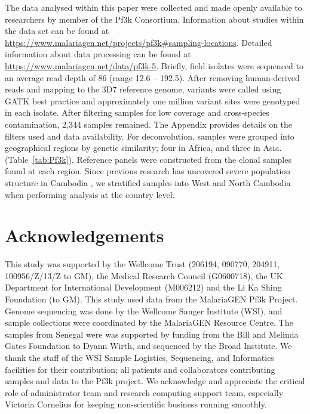 \documentclass[9pt,lineno]{elife}
\begin{document}
The data analysed within this paper were collected and made openly available to researchers by member of the Pf3k Consortium.  Information about studies within the data set can be found at \url{https://www.malariagen.net/projects/pf3k#sampling-locations}.  Detailed information about data processing can be found at \url{https://www.malariagen.net/data/pf3k-5}.  Briefly, field isolates were sequenced to an average read depth of 86 (range 12.6 -- 192.5).  After removing human-derived reads and mapping to the 3D7 reference genome, variants were called using GATK best practice and approximately one million variant sites were genotyped in each isolate. After filtering samples for low coverage and cross-species contamination, 2,344 samples remained.    The Appendix provides details on the filters used and data availability. For deconvolution, samples were grouped into geographical regions by genetic similarity; four in Africa, and three in Asia. (Table~\ref{tab:Pf3k}). Reference panels were constructed from the clonal samples found at each region. Since previous research has uncovered severe population structure in Cambodia \citep{Miotto2013}, we stratified samples into West and North Cambodia when performing analysis at the country level.



\section{Acknowledgements}
This study was supported by the Wellcome Trust (206194, 090770, 204911, 100956/Z/13/Z to GM), the Medical Research Council (G0600718), the UK Department for International Development (M006212) and the Li Ka Shing Foundation (to GM). This study used data from the MalariaGEN Pf3k Project. Genome sequencing was done by the Wellcome Sanger Institute (WSI), and sample collections were coordinated by the MalariaGEN Resource Centre. The samples from Senegal were was supported by funding from the Bill and Melinda Gates Foundation to Dyann Wirth, and sequenced by the Broad Institute. We thank the staff of the WSI Sample Logistics, Sequencing, and Informatics facilities for their contribution; all patients and collaborators contributing samples and data to the Pf3k project. We acknowledge and appreciate the critical role of administrator team and research computing support team, especially Victoria Cornelius for keeping non-scientific business running smoothly.
\end{document}
